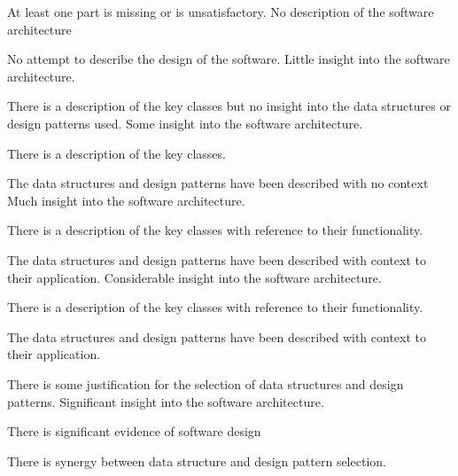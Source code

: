 \documentclass{../../fal_assignment}
\begin{document}
{}
\begin{markingrubric}
		\grade\fail At least one part is missing or is unsatisfactory.
%
	\grade\fail No description of the software architecture
	\par No attempt to describe the design of the software.
	\grade Little insight into the software architecture.
	\par There is a description of the key classes but no insight into the data structures or design patterns used.
	\grade Some insight into the software architecture.
	\par There is a description of the key classes.
	\par The data structures and design patterns have been described with no context
	\grade Much insight into the software architecture.
	\par There is a description of the key classes with reference to their functionality.
	\par The data structures and design patterns have been described with context to their application.
	\grade Considerable insight into the software architecture.
	\par There is a description of the key classes with reference to their functionality.
	\par The data structures and design patterns have been described with context to their application.
	\par There is some justification for the selection of data structures and design patterns.
	\grade Significant insight into the software architecture.
	\par There is significant evidence of software design
	\par There is synergy between data structure and design pattern selection.

\end{markingrubric}
\end{document}
